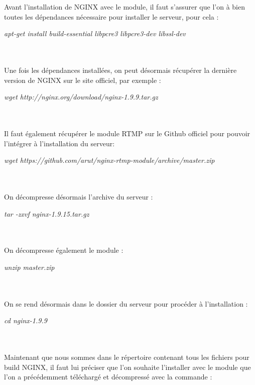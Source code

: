 \documentclass{report}
\begin{document}
    Avant l’installation de NGINX avec le module, il faut s’assurer que l’on à bien toutes les dépendances nécessaire pour installer le serveur, pour cela : 


    \begin{center}
    \textit{apt-get install build-essential libpcre3 libpcre3-dev libssl-dev}
    \end{center}
    \\
    \\
    Une fois les dépendances installées, on peut désormais récupérer la dernière version de NGINX sur le site officiel, par exemple :


    \begin{center}
    \textit{wget http://nginx.org/download/nginx-1.9.9.tar.gz}
    \end{center}
    \\
    \\
    Il faut également récupérer le module RTMP sur le Github officiel pour pouvoir l’intégrer à l’installation du serveur:


    \begin{center}
    \textit{wget https://github.com/arut/nginx-rtmp-module/archive/master.zip}
    \end{center}
    \\
    \\
   On décompresse désormais l’archive du serveur :


    \begin{center}
    \textit{tar -zxvf nginx-1.9.15.tar.gz}
    \end{center}
    \\
    \\
    On décompresse également le module :


    \begin{center}
    \textit{unzip master.zip}
    \end{center}
    \\
    \\
    On se rend désormais dans le dossier du serveur pour procéder à l’installation :


    \begin{center}
    \textit{cd nginx-1.9.9}
    \end{center}
    \\
    \\
    Maintenant que nous sommes dans le répertoire contenant tous les fichiers pour build NGINX, il faut lui préciser que l’on souhaite l’installer avec le module que l’on a précédemment téléchargé et décompressé avec la commande : 
\end{document}

